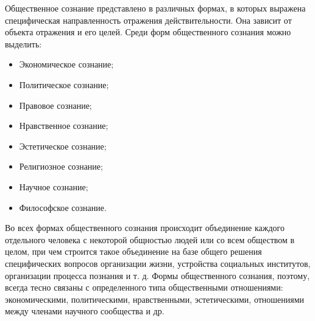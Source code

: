 \documentclass[12pt]{article}
\begin{document}
Общественное  сознание  представлено  в  различных  формах,  в  которых  выражена  специфическая
направленность отражения действительности. Она зависит от объекта отражения и его целей. Среди форм
общественного сознания можно выделить:
\begin{itemize}
  \item Экономическое сознание;
  \item Политическое сознание;
\item Правовое сознание;
\item Нравственное сознание;
\item Эстетическое сознание;
\item Религиозное сознание;
\item Научное сознание;
\item Философское сознание.
\end{itemize}
Во всех формах общественного сознания происходит объединение каждого отдельного человека с некоторой
общностью людей  или со всем  обществом в  целом, при  чем строится такое объединение  на базе  общего
решения  специфических  вопросов  организации  жизни,  устройства  социальных  институтов,  организации
процесса познания и т. д. Формы общественного сознания, поэтому, всегда тесно связаны с определенного типа
общественными  отношениями:  экономическими,  политическими,  нравственными,  эстетическими,
отношениями между членами научного сообщества и др.

\newpage
\end{document}
